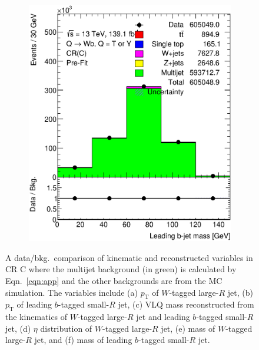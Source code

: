 \begin{figure}[hbt!]
\begin{subfigure}{.35\textwidth}
		\caption{}
		\label{fig:app:cr_c:ljet_m}
	\end{subfigure}\hspace{0.6cm}
	\begin{subfigure}{.35\textwidth}
		\centering
		\includegraphics[width=\linewidth,height=\textheight,keepaspectratio]{CR_C_jet_m.eps}
		\caption{}
		\label{fig:app:cr_c:jet_m}
	\end{subfigure}
	\caption{A data/bkg.\ comparison of kinematic and reconstructed variables in CR C where the multijet background (in green) is calculated by Eqn.\ \ref{eqn:app} and the other backgrounds are from the MC simulation. The variables include (a) $p_{\text{T}}$ of $W$-tagged large-$R$ jet, (b) $p_{\text{T}}$ of leading $b$-tagged small-$R$ jet, (c) VLQ mass reconstructed from the kinematics of $W$-tagged large-$R$ jet and leading $b$-tagged small-$R$ jet, (d) $\eta$ distribution of $W$-tagged large-$R$ jet, (e) mass of $W$-tagged large-$R$ jet, and (f) mass of leading $b$-tagged small-$R$ jet.}
	\label{fig:app:cr_c}
\end{figure}








